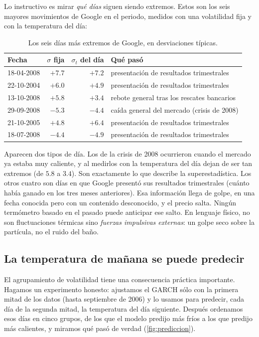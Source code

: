 \documentclass[11pt,a4paper]{article}
\begin{document}
Lo instructivo es mirar \emph{qué días} siguen siendo extremos. Estos son los seis mayores movimientos de
Google en el periodo, medidos con una volatilidad fija y con la temperatura del día:

\begin{table}[ht]
\centering\small
\caption{Los seis días más extremos de Google, en desviaciones típicas.}
\label{tab:seis}
\begin{tabular}{@{}lrrl@{}}
\toprule
Fecha & $\sigma$ fija & $\sigma_t$ del día & Qué pasó\\
\midrule
18-04-2008 & $+7.7$ & $+7.2$ & presentación de resultados trimestrales\\
22-10-2004 & $+6.0$ & $+4.9$ & presentación de resultados trimestrales\\
13-10-2008 & $+5.8$ & $+3.4$ & rebote general tras los rescates bancarios\\
29-09-2008 & $-5.3$ & $-4.4$ & caída general del mercado (crisis de 2008)\\
21-10-2005 & $+4.8$ & $+6.4$ & presentación de resultados trimestrales\\
18-07-2008 & $-4.4$ & $-4.9$ & presentación de resultados trimestrales\\
\bottomrule
\end{tabular}
\end{table}

Aparecen dos tipos de día. Los de la crisis de 2008 ocurrieron cuando el mercado ya estaba muy caliente,
y al medirlos con la temperatura del día dejan de ser tan extremos (de $5.8$ a $3.4$). Son exactamente lo
que describe la superestadística. Los otros cuatro son días en que Google presentó sus resultados
trimestrales (cuánto había ganado en los tres meses anteriores). Esa información llega de golpe, en una
fecha conocida pero con un contenido desconocido, y el precio salta. Ningún termómetro basado en el pasado
puede anticipar ese salto. En lenguaje físico, no son fluctuaciones térmicas sino \emph{fuerzas
impulsivas externas}: un golpe seco sobre la partícula, no el ruido del baño.

\subsection{La temperatura de mañana se puede predecir}

El agrupamiento de volatilidad tiene una consecuencia práctica importante. Hagamos un experimento honesto:
ajustamos el GARCH sólo con la primera mitad de los datos (hasta septiembre de 2006) y lo usamos para
predecir, cada día de la segunda mitad, la temperatura del día siguiente. Después ordenamos esos días en
cinco grupos, de los que el modelo predijo más fríos a los que predijo más calientes, y miramos qué pasó
de verdad (\cref{fig:prediccion}).
\end{document}
